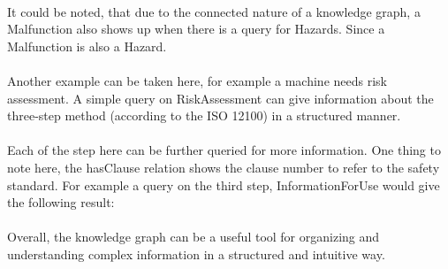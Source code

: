 \bigskip\bigskip {}

\paragraph{} It could be noted, that due to the connected nature of a knowledge graph, a Malfunction also shows up when there is a query for Hazards. Since a Malfunction is also a Hazard.


\bigskip\bigskip {}

\paragraph{} Another example can be taken here, for example a machine needs risk assessment. A simple query on RiskAssessment can give information about the three-step method (according to the ISO 12100) in a structured manner.


\bigskip\bigskip {}

\paragraph{} Each of the step here can be further queried for more information. One thing to note here, the hasClause relation shows the clause number to refer to the safety standard. For example a query on the third step, InformationForUse would give the following result:


\bigskip\bigskip {}

\paragraph{} Overall, the knowledge graph can be a useful tool for organizing and understanding complex information in a structured and intuitive way.

